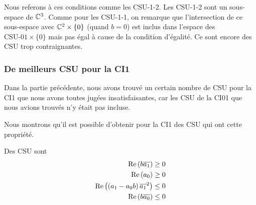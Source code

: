       Nous referons à ces conditions comme les CSU-1-2. Les CSU-1-2 sont un sous-espace de \(\mathbb C^3\). Comme pour les CSU-1-1, on remarque que l'intersection de ce sous-espace avec \(\mathbb C^2 \times \lbrace0\rbrace\) (quand \(b=0\)) est inclus dans l'espace des \(\text{CSU-01}\times\lbrace0\rbrace\) mais pas égal à cause de la condition d'égalité. Ce sont encore des CSU trop contraignantes.



        

    \subsubsection{De meilleurs CSU pour la CI1}
      Dans la partie précédente, nous avons trouvé un certain nombre de CSU pour la CI1 que nous avons toutes jugées insatisfaisantes, car les CSU de la CI01 que nous avions trouvés n'y était pas incluse.%

      Nous montrons qu'il est possible d'obtenir pour la CI1 des CSU qui ont cette propriété.

      \begin{prop} Des CSU sont
          \begin{align}
            \operatorname{Re}\left(b{\overline{a_1}}\right) \ge 0
            \\
            \operatorname{Re}\left(a_0\right) \ge 0
            \\
            \operatorname{Re}\left(\left(a_1-a_0 b\right){{\overline{a_1}}^2}\right) \le 0
            \\
            \operatorname{Re}\left(b{\overline{a_0}}\right) \le 0
          \end{align}
      \end{prop}


